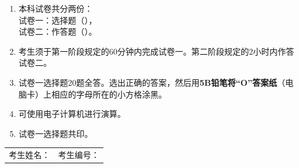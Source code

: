 \documentclass[12pt,a4paper]{exam-zh}
\begin{document}
    \begin{enumerate}[label=\arabic*、,leftmargin=2em,itemsep=0.65em]
    \item 本科试卷共分两份：\\
    试卷一：选择题（\paperonepercentage），\\
    试卷二：作答题（\papertwopercentage）。

    \item 考生须于第一阶段规定的60分钟内完成试卷一。第二阶段规定的2小时内作答试卷二。

    \item 试卷一选择题20题全答。选出正确的答案，然后用\textbf{5B铅笔将“O”答案纸}（电脑卡）上相应的字母所在的小方格涂黑。

    \item 可使用电子计算机进行演算。

    \item 试卷一选择题共印\questionpages。
    \end{enumerate}

    \vspace{2.0em}

    \begin{center}
    {\setlength{\fboxrule}{1.2pt}}
    \end{center}

    \vfill

    \begin{tabular*}{\linewidth}{@{\extracolsep{\fill}}ll}
    考生姓名：\underline{\hspace{4.2cm}} & 考生编号：\underline{\hspace{4.0cm}}
    \end{tabular*}


\newpage
\end{document}
